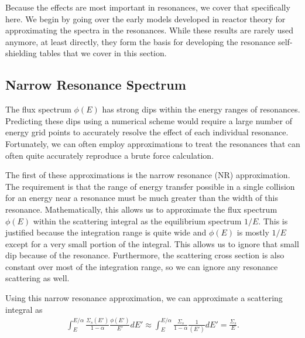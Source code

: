 Because the effects are most important in resonances, we cover that specifically here. We begin by going over the early models developed in reactor theory for approximating the spectra in the resonances. While these results are rarely used anymore, at least directly, they form the basis for developing the resonance self-shielding tables that we cover in this section.

\subsection{Narrow Resonance Spectrum}

The flux spectrum $\phi(E)$ has strong dips within the energy ranges of resonances. Predicting these dips using a numerical scheme would require a large number of energy grid points to accurately resolve the effect of each individual resonance. Fortunately, we can often employ approximations to treat the resonances that can often quite accurately reproduce a brute force calculation.

The first of these approximations is the narrow resonance (NR) approximation. The requirement is that the range of energy transfer possible in a single collision for an energy near a resonance must be much greater than the width of this resonance. Mathematically, this allows us to approximate the flux spectrum $\phi(E)$ within the scattering integral as the equilibrium spectrum $1/E$. This is justified because the integration range is quite wide and $\phi(E)$ is mostly $1/E$ except for a very small portion of the integral. This allows us to ignore that small dip because of the resonance. Furthermore, the scattering cross section is also constant over most of the integration range, so we can ignore any resonance scattering as well. 

Using this narrow resonance approximation, we can approximate a scattering integral as
\begin{align}
  \int_E^{E/\alpha} \frac{\Sigma_s(E')}{ 1 - \alpha } \frac{ \phi(E') }{ E' } dE' \approx \int_E^{E/\alpha} \frac{\Sigma_s}{ 1 - \alpha } \frac{ 1 }{ ( E' ) } dE' = \frac{\Sigma_s}{E} .
\end{align}

